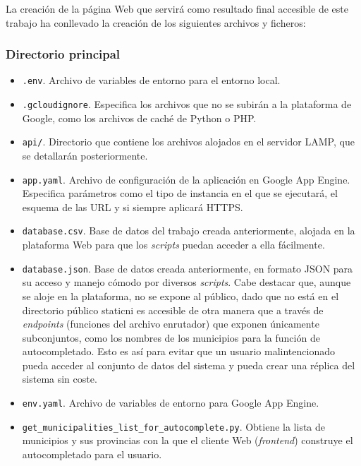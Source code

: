 La creación de la página Web que servirá como resultado final accesible de este trabajo ha conllevado la creación de los siguientes archivos y ficheros:

\subsubsection{Directorio principal}

\begin{itemize}
	\item \texttt{.env}. Archivo de variables de entorno para el entorno local.
	\item \texttt{.gcloudignore}. Especifica los archivos que no se subirán a la plataforma de Google, como los archivos de caché de Python o PHP.
	\item \texttt{api/}. Directorio que contiene los archivos alojados en el servidor LAMP, que se detallarán posteriormente.
	\item \texttt{app.yaml}. Archivo de configuración de la aplicación en Google App Engine. Especifica parámetros como el tipo de instancia en el que se ejecutará, el esquema de las URL y si siempre aplicará HTTPS.
	\item \texttt{database.csv}. Base de datos del trabajo creada anteriormente, alojada en la plataforma Web para que los \textit{scripts} puedan acceder a ella fácilmente.
	\item \texttt{database.json}. Base de datos creada anteriormente, en formato JSON para su acceso y manejo cómodo por diversos \textit{scripts}. Cabe destacar que, aunque se aloje en la plataforma, no se expone al público, dado que no está en el directorio público \guillemotleft static\guillemotright\space ni es accesible de otra manera que a través de \textit{endpoints} (funciones del archivo enrutador) que exponen únicamente subconjuntos, como los nombres de los municipios para la función de autocompletado. Esto es así para evitar que un usuario malintencionado pueda acceder al conjunto de datos del sistema y pueda crear una réplica del sistema sin coste.
	\item \texttt{env.yaml}. Archivo de variables de entorno para Google App Engine.
	\item \texttt{get\_municipalities\_list\_for\_autocomplete.py}. Obtiene la lista de municipios y sus provincias con la que el cliente Web (\textit{frontend}) construye el autocompletado para el usuario.

\end{itemize}
